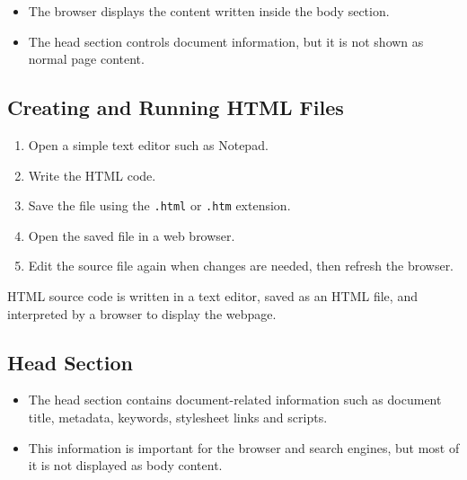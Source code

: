 \begin{itemize}
    \item The browser displays the content written inside the body section.
    \item The head section controls document information, but it is not shown as normal page content.
\end{itemize}

\subsection{Creating and Running HTML Files}
\begin{enumerate}
    \item Open a simple text editor such as Notepad.
    \item Write the HTML code.
    \item Save the file using the \texttt{.html} or \texttt{.htm} extension.
    \item Open the saved file in a web browser.
    \item Edit the source file again when changes are needed, then refresh the browser.
\end{enumerate}

\begin{summarybox}
HTML source code is written in a text editor, saved as an HTML file, and interpreted by a browser to display the webpage.
\end{summarybox}

\subsection{Head Section}

\begin{itemize}
    \item The head section contains document-related information such as document title, metadata, keywords, stylesheet links and scripts.
    \item This information is important for the browser and search engines, but most of it is not displayed as body content.
\end{itemize}

